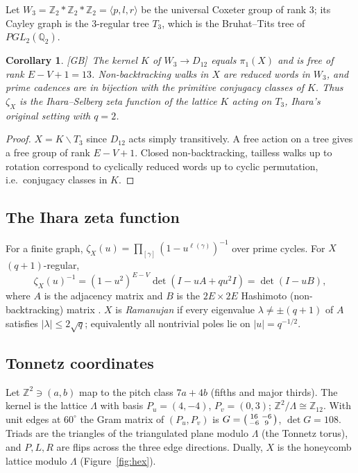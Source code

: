 \documentclass[11pt]{amsart}
\numberwithin{equation}{section}
\theoremstyle{plain}
\newtheorem{corollary}[theorem]{Corollary}
\theoremstyle{definition}\newtheorem{definition}[theorem]{Definition}
\theoremstyle{remark}\newtheorem{remark}[theorem]{Remark}
\newcommand{\Z}{\mathbb{Z}}\newcommand{\Q}{\mathbb{Q}}\newcommand{\C}{\mathbb{C}}\newcommand{\F}{\mathbb{F}}\newcommand{\R}{\mathbb{R}}
\newcommand{\ctag}[1]{\textup{\textsf{\scriptsize[#1]}}}
\begin{document}
Let $W_3=\Z_2*\Z_2*\Z_2=\langle p,l,r\rangle$ be the universal Coxeter group of rank 3; its Cayley graph is the 3-regular tree $T_3$, which is the Bruhat--Tits tree of $PGL_2(\Q_2)$.
\begin{corollary}\label{cor:betti}
\ctag{GB}\ The kernel $K$ of $W_3\to D_{12}$ equals $\pi_1(X)$ and is free of rank $E-V+1=13$. Non-backtracking walks in $X$ are reduced words in $W_3$, and prime cadences are in bijection with the primitive conjugacy classes of $K$. Thus $\zeta_X$ is the Ihara--Selberg zeta function of the lattice $K$ acting on $T_3$, Ihara's original setting with $q=2$.
\end{corollary}
\begin{proof}
$X=K\backslash T_3$ since $D_{12}$ acts simply transitively. A free action on a tree gives a free group of rank $E-V+1$. Closed non-backtracking, tailless walks up to rotation correspond to cyclically reduced words up to cyclic permutation, i.e.\ conjugacy classes in $K$.
\end{proof}

\subsection{The Ihara zeta function}
For a finite graph, $\zeta_X(u)=\prod_{[\gamma]}(1-u^{\ell(\gamma)})^{-1}$ over prime cycles. For $X$ $(q+1)$-regular,
\begin{equation}\label{eq:ib}
\zeta_X(u)^{-1}=(1-u^2)^{E-V}\det(I-uA+qu^2I)=\det(I-uB),
\end{equation}
where $A$ is the adjacency matrix and $B$ is the $2E\times 2E$ Hashimoto (non-backtracking) matrix \cite{ihara66,hashimoto89,bass92,kotani}. $X$ is \emph{Ramanujan} if every eigenvalue $\lambda\neq\pm(q+1)$ of $A$ satisfies $|\lambda|\le 2\sqrt q$; equivalently all nontrivial poles lie on $|u|=q^{-1/2}$.

\subsection{Tonnetz coordinates}
Let $\Z^2\ni(a,b)$ map to the pitch class $7a+4b$ (fifths and major thirds). The kernel is the lattice $\Lambda$ with basis $P_u=(4,-4)$, $P_v=(0,3)$; $\Z^2/\Lambda\cong\Z_{12}$. With unit edges at $60^\circ$ the Gram matrix of $(P_u,P_v)$ is $G=\begin{psmallmatrix}16&-6\\-6&9\end{psmallmatrix}$, $\det G=108$. Triads are the triangles of the triangulated plane modulo $\Lambda$ (the Tonnetz torus), and $P,L,R$ are flips across the three edge directions. Dually, $X$ is the honeycomb lattice modulo $\Lambda$ (Figure~\ref{fig:hex}).
\end{document}
